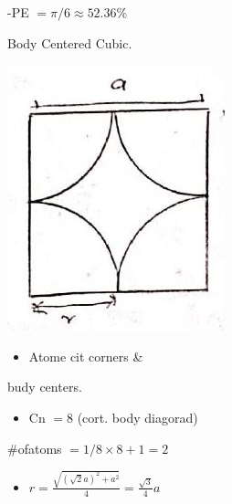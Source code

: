 \documentclass[10pt]{article}
\begin{document}
-PE $=\pi / 6 \approx 52.36 \%$

Body Centered Cubic.

\begin{center}
\includegraphics[max width=\textwidth]{2024_06_16_30d750483617f1939202g-07(2)}
\end{center}

\begin{itemize}
  \item Atome cit corners \&
\end{itemize}

budy centers.

\begin{itemize}
  \item Cn $=8$ (cort. body diagorad)
\end{itemize}

\#ofatoms $=1 / 8 \times 8+1=2$

\begin{itemize}
  \item $r=\frac{\sqrt{(\sqrt{2} a)^{2}+a^{2}}}{4}=\frac{\sqrt{3}}{4} a$
\end{itemize}
\end{document}
